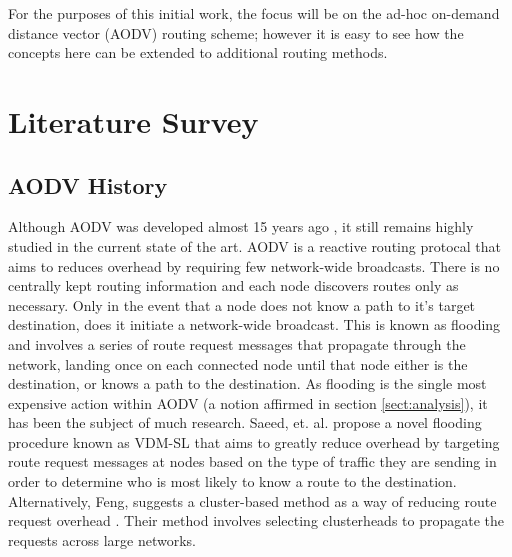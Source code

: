 \documentclass[conference]{IEEEtran}
\begin{document}
For the purposes of this initial work, the focus will be on the ad-hoc on-demand distance vector  (AODV) routing scheme; however it is easy to see how the concepts here can be extended to additional routing methods.

\section{Literature Survey}

\subsection{AODV History}

Although AODV was developed almost 15 years ago \cite{rfc3561}, it still remains highly studied in the current state of the art. AODV is a reactive routing protocal that aims to reduces overhead by requiring few network-wide broadcasts. There is no centrally kept routing information and each node discovers routes only as necessary. Only in the event that a node does not know a path to it's target destination, does it initiate a network-wide broadcast. This is known as flooding and involves a series of route request messages that propagate through the network, landing once on each connected node until that node either is the destination, or knows a path to the destination. As flooding is the single most expensive action within AODV (a notion affirmed in section \ref{sect:analysis}), it has been the subject of much research. Saeed, et. al. \cite{7813246} propose a novel flooding procedure known as VDM-SL that aims to greatly reduce overhead by targeting route request messages at nodes based on the type of traffic they are sending in order to determine who is most likely to know a route to the destination. Alternatively, Feng, suggests a cluster-based method as a way of reducing route request overhead \cite{8343729}. Their method involves selecting clusterheads to propagate the requests across large networks.
\end{document}
